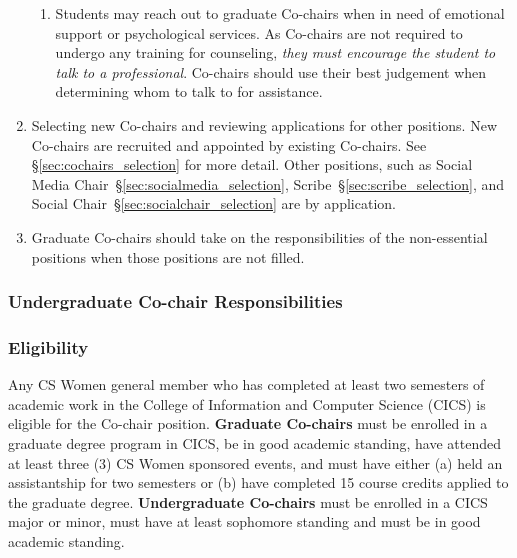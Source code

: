 \begin{enumerate}
\begin{enumerate}
	\item\label{item:psych} Students may reach out to graduate Co-chairs when in need of emotional support or psychological services. As Co-chairs are not required to undergo any training for counseling, \emph{they must encourage the student to talk to a professional}. Co-chairs should use their best judgement when determining whom to talk to for assistance.
	\end{enumerate}
	\item\label{item:review} Selecting new Co-chairs and reviewing applications for other positions. New Co-chairs are recruited and appointed by existing Co-chairs. See \S\ref{sec:cochairs_selection} for more detail. Other positions, such as Social Media Chair~\S\ref{sec:socialmedia_selection}, Scribe~\S\ref{sec:scribe_selection}, and Social Chair~\S\ref{sec:socialchair_selection} are by application.
	\item\label{item:other} Graduate Co-chairs should take on the responsibilities of the non-essential positions when those positions are not filled.
\end{enumerate}

\subsubsection{Undergraduate Co-chair Responsibilities}


\subsubsection{Eligibility}
\label{sec:cochairs_eligibility}
Any CS Women general member who has completed at least two semesters of academic work in the College of Information and Computer Science (CICS) is eligible for the Co-chair position. \textbf{Graduate Co-chairs} must be enrolled in a graduate degree program in CICS, be in good academic standing, have attended at least three (3) CS Women sponsored events, and must have either (a) held an assistantship for two semesters or (b) have completed 15 course credits applied to the graduate degree. \textbf{Undergraduate Co-chairs} must be enrolled in a CICS major or minor, must have at least sophomore standing and must be in good academic standing.

